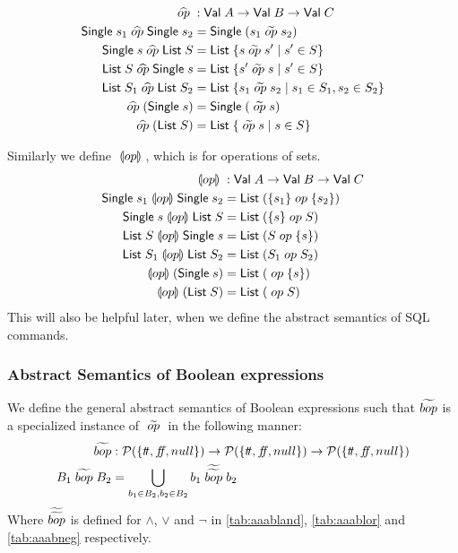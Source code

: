\begin{align}
    \aop &: \mathsf{Val} \; A \rightarrow \mathsf{Val} \; B \rightarrow \mathsf{Val} \; C \label{eq:operation} \\
    \mathsf{Single} \; s_1 \aop \mathsf{Single} \; s_2 &= \mathsf{Single} \; (s_1 \aaop s_2) \label{eq:generalBOP} \\
    \mathsf{Single} \; s \aop \mathsf{List} \; S &= \mathsf{List} \; \{ s \aaop s' \mid s' \in S \} \\
    \mathsf{List} \; S \aop \mathsf{Single} \; s &= \mathsf{List} \; \{ s' \aaop s \mid s' \in S \}  \\
    \mathsf{List} \; S_1 \aop \mathsf{List} \; S_2 &= \mathsf{List} \; \{ s_1 \aaop s_2 \mid s_1 \in S_1, s_2 \in S_2 \} \\
    \aop (\mathsf{Single} \; s) &= \mathsf{Single} \; (\aaop s) \\
    \aop (\mathsf{List} \; S) &= \mathsf{List} \; \{ \aaop s \mid s \in S \} \label{eq:generalUOP}
\end{align}

Similarly we define $\;\llparenthesis op\rrparenthesis\;$, which is for operations of sets.
\begin{align}
    \;\llparenthesis op\rrparenthesis\; &: \mathsf{Val} \; A \rightarrow \mathsf{Val} \; B \rightarrow \mathsf{Val} \; C \\
    \mathsf{Single} \; s_1 \;\llparenthesis op\rrparenthesis\; \mathsf{Single} \; s_2 &= \mathsf{List} \; (\{s_1\} \;op\; \{s_2\}) \\
    \mathsf{Single} \; s \;\llparenthesis op\rrparenthesis\; \mathsf{List} \; S &= \mathsf{List} \; (\{ s \} \;op\; S) \\
    \mathsf{List} \; S \;\llparenthesis op\rrparenthesis\; \mathsf{Single} \; s &= \mathsf{List} \; (S \;op\; \{ s \})  \\
    \mathsf{List} \; S_1 \;\llparenthesis op\rrparenthesis\; \mathsf{List} \; S_2 &= \mathsf{List} \; (S_1 \;op\; S_2) \\
    \;\llparenthesis op\rrparenthesis\; (\mathsf{Single} \; s) &= \mathsf{List} \; (\;op\; \{ s \}) \\
    \;\llparenthesis op\rrparenthesis\; (\mathsf{List} \; S) &= \mathsf{List} \; (\;op\; S )
\end{align}
This will also be helpful later, when we define the abstract semantics of SQL commands.

\subsubsection{Abstract Semantics of Boolean expressions}
We define the general abstract semantics of Boolean expressions such that $\widetilde{bop}$ is a specialized instance of $\;\widetilde{op}\;$ in the following manner:
\begin{align}
    \aab{bop} &: \mathcal{P}(\{\true, \false, null\}) \rightarrow \mathcal{P}(\{\true, \false, null\}) \rightarrow \mathcal{P}(\{\true, \false, null\})\\
    B_1 \;\aab{bop}\; B_2 &= \bigcup_{b_1 \in B_2, b_2 \in B_2} b_1 \;\aaab{bop}\; b_2
\end{align}
Where $\widetilde{\widetilde{bop}}$ is defined for $\land$, $\lor$ and $\neg$ in \autoref{tab:aaabland}, \autoref{tab:aaablor} and \autoref{tab:aaabneg} respectively.

